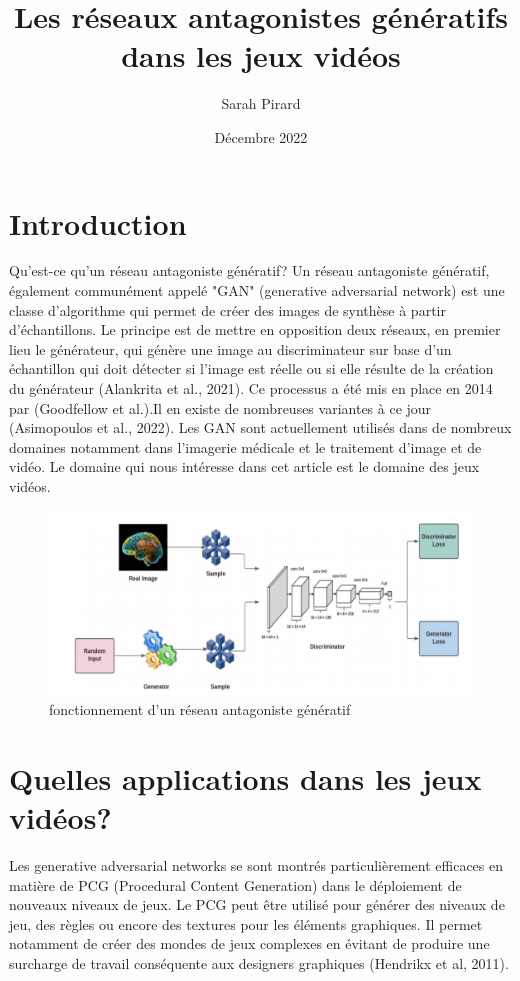\documentclass[a4paper,11pt]{article} %
\title{Les réseaux antagonistes génératifs dans les jeux vidéos}
\author{Sarah Pirard}
\date{Décembre 2022}
\begin{document}
\maketitle

\section{Introduction}
Qu'est-ce qu'un réseau antagoniste génératif? Un réseau antagoniste génératif, également communément appelé "GAN" (generative adversarial network) est une classe d'algorithme qui permet de créer des images de synthèse à partir d'échantillons. Le principe est de mettre en opposition deux réseaux, en premier lieu le générateur, qui génère une image au discriminateur sur base d'un échantillon qui doit détecter si l'image est réelle ou si elle résulte de la création du générateur (Alankrita et al., 2021). Ce processus a été mis en place en 2014 par (Goodfellow et al.).Il en existe de nombreuses variantes à ce jour (Asimopoulos et al., 2022). Les GAN sont actuellement utilisés dans de nombreux domaines notamment dans l'imagerie médicale et le traitement d'image et de vidéo. Le domaine qui nous intéresse dans cet article est le domaine des jeux vidéos. 

\begin{figure}[h] %
  \centering %
  \includegraphics[scale=0.17]{GAN}


  \caption{fonctionnement d'un réseau antagoniste génératif} %
\end{figure}

\section{Quelles applications dans les jeux vidéos?}

Les generative adversarial networks se sont montrés particulièrement efficaces en matière de PCG (Procedural Content Generation) dans le déploiement de nouveaux niveaux de jeux. Le PCG peut être utilisé pour générer des niveaux de jeu, des règles ou encore des textures pour les éléments graphiques. Il permet notamment de créer des mondes de jeux complexes en évitant de produire une surcharge de travail conséquente aux designers graphiques (Hendrikx et al, 2011).
\end{document}
